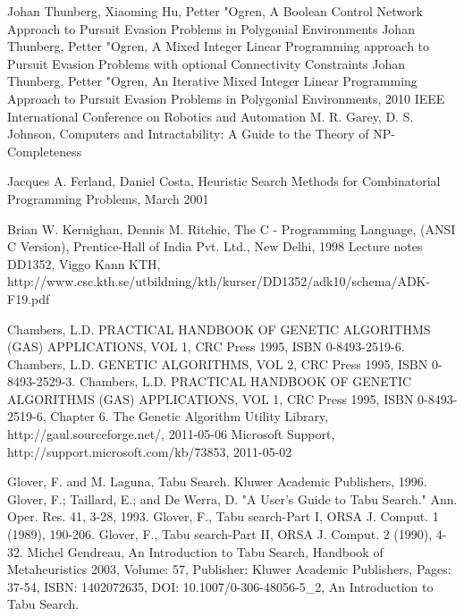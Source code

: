 \begin{thebibliography}{99}
  Johan Thunberg, Xiaoming Hu, Petter "Ogren, A Boolean Control Network Approach to Pursuit Evasion Problems in Polygonial Environments
 Johan Thunberg, Petter "Ogren, A Mixed Integer Linear Programming approach to Pursuit Evasion Problems with optional Connectivity Constraints
 Johan Thunberg, Petter "Ogren, An Iterative Mixed Integer Linear Programming Approach to Pursuit Evasion Problems in Polygonial Environments, 2010 IEEE International Conference on Robotics and Automation
 M. R. Garey, D. S. Johnson, Computers and Intractability: A Guide to the Theory of NP-Completeness

Jacques A. Ferland, Daniel Costa, Heuristic Search Methods for Combinatorial Programming Problems, March 2001

 Brian W. Kernighan, Dennis M. Ritchie, The C - Programming Language, (ANSI C Version), Prentice-Hall of India Pvt. Ltd., New Delhi, 1998
Lecture notes DD1352, Viggo Kann KTH,  http://www.csc.kth.se/utbildning/kth/kurser/DD1352/adk10/schema/ADK-F19.pdf

 Chambers, L.D. PRACTICAL HANDBOOK OF GENETIC ALGORITHMS (GAS) APPLICATIONS, VOL 1, CRC Press 1995, ISBN 0-8493-2519-6.
 Chambers, L.D. GENETIC ALGORITHMS, VOL 2, CRC Press 1995, ISBN 0-8493-2529-3.
 Chambers, L.D. PRACTICAL HANDBOOK OF GENETIC ALGORITHMS (GAS) APPLICATIONS, VOL 1, CRC Press 1995, ISBN 0-8493-2519-6, Chapter 6.
 The Genetic Algorithm Utility Library, http://gaul.sourceforge.net/, 2011-05-06
 Microsoft Support, http://support.microsoft.com/kb/73853, 2011-05-02


 Glover, F. and M. Laguna, Tabu Search. Kluwer Academic Publishers, 1996.
 Glover, F.; Taillard, E.; and De Werra, D. "A User's Guide to Tabu Search." Ann. Oper. Res. 41, 3-28, 1993.
 Glover, F., Tabu search-Part I, ORSA J. Comput. 1 (1989), 190-206.
 Glover, F., Tabu search-Part II, ORSA J. Comput. 2 (1990), 4-32.
 Michel Gendreau, An Introduction to Tabu Search, Handbook of Metaheuristics 2003, Volume: 57, Publisher: Kluwer Academic Publishers, Pages: 37-54, ISBN: 1402072635, DOI: 10.1007/0-306-48056-5\_2, An Introduction to Tabu Search.



\end{thebibliography}
